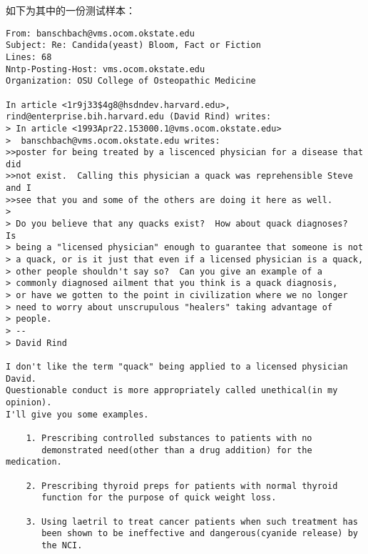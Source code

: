 \documentclass[11pt]{article}
\begin{document}
如下为其中的一份测试样本：

\begin{verbatim}
From: banschbach@vms.ocom.okstate.edu
Subject: Re: Candida(yeast) Bloom, Fact or Fiction
Lines: 68
Nntp-Posting-Host: vms.ocom.okstate.edu
Organization: OSU College of Osteopathic Medicine

In article <1r9j33$4g8@hsdndev.harvard.edu>, rind@enterprise.bih.harvard.edu (David Rind) writes:
> In article <1993Apr22.153000.1@vms.ocom.okstate.edu>
>  banschbach@vms.ocom.okstate.edu writes:
>>poster for being treated by a liscenced physician for a disease that did 
>>not exist.  Calling this physician a quack was reprehensible Steve and I 
>>see that you and some of the others are doing it here as well.  
> 
> Do you believe that any quacks exist?  How about quack diagnoses?  Is
> being a "licensed physician" enough to guarantee that someone is not
> a quack, or is it just that even if a licensed physician is a quack,
> other people shouldn't say so?  Can you give an example of a
> commonly diagnosed ailment that you think is a quack diagnosis,
> or have we gotten to the point in civilization where we no longer
> need to worry about unscrupulous "healers" taking advantage of
> people.
> -- 
> David Rind

I don't like the term "quack" being applied to a licensed physician David.
Questionable conduct is more appropriately called unethical(in my opinion).
I'll give you some examples.

    1. Prescribing controlled substances to patients with no 
       demonstrated need(other than a drug addition) for the medication.

    2. Prescribing thyroid preps for patients with normal thyroid 
       function for the purpose of quick weight loss.

    3. Using laetril to treat cancer patients when such treatment has 
       been shown to be ineffective and dangerous(cyanide release) by 
       the NCI.


\end{verbatim}
\end{document}
